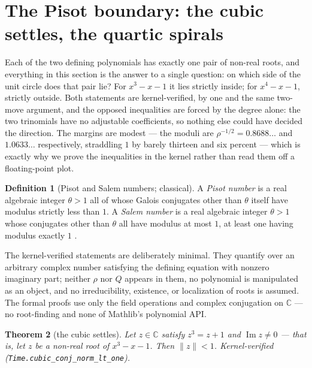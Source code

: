 \documentclass[11pt]{amsart}
\theoremstyle{plain}
\newtheorem{theorem}{Theorem}[section]
\theoremstyle{definition}
\newtheorem{definition}[theorem]{Definition}
\theoremstyle{remark}
\begin{document}
\section{The Pisot boundary: the cubic settles, the quartic spirals}\label{sec:boundary}

Each of the two defining polynomials has exactly one pair of non-real roots, and everything in this section is the answer to a single question: on which side of the unit circle does that pair lie? For $x^3 - x - 1$ it lies strictly inside; for $x^4 - x - 1$, strictly outside. Both statements are kernel-verified, by one and the same two-move argument, and the opposed inequalities are forced by the degree alone: the two trinomials have no adjustable coefficients, so nothing else could have decided the direction. The margins are modest --- the moduli are $\rho^{-1/2} = 0.8688\ldots$ and $1.0633\ldots$ respectively, straddling $1$ by barely thirteen and six percent --- which is exactly why we prove the inequalities in the kernel rather than read them off a floating-point plot.

\begin{definition}[Pisot and Salem numbers; classical]\label{def:pisot}
A \emph{Pisot number} is a real algebraic integer $\theta > 1$ all of whose Galois conjugates other than $\theta$ itself have modulus strictly less than $1$. A \emph{Salem number} is a real algebraic integer $\theta > 1$ whose conjugates other than $\theta$ all have modulus at most $1$, at least one having modulus exactly $1$ \cite{bertin1992}.
\end{definition}

The kernel-verified statements are deliberately minimal. They quantify over an arbitrary complex number satisfying the defining equation with nonzero imaginary part; neither $\rho$ nor $Q$ appears in them, no polynomial is manipulated as an object, and no irreducibility, existence, or localization of roots is assumed. The formal proofs use only the field operations and complex conjugation on $\mathbb{C}$ --- no root-finding and none of Mathlib's polynomial API.

\begin{theorem}[the cubic settles]\label{thm:cubic-inside}
Let $z \in \mathbb{C}$ satisfy $z^3 = z + 1$ and $\operatorname{Im} z \neq 0$ --- that is, let $z$ be a non-real root of $x^3 - x - 1$. Then $\lVert z \rVert < 1$. Kernel-verified (\texttt{Time.cubic\_conj\_norm\_lt\_one}).
\end{theorem}
\end{document}
